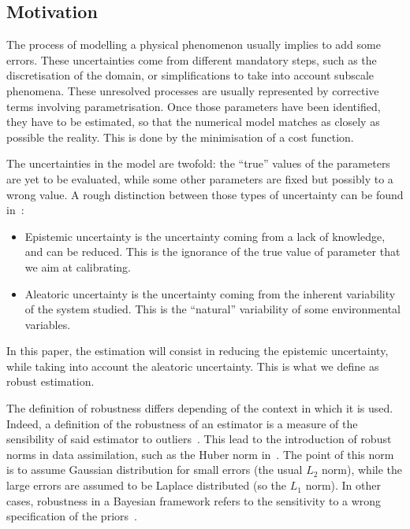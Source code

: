 \documentclass[npg, manuscript]{copernicus}
\begin{document}
\introduction%
\subsection{Motivation}

The process of modelling a physical phenomenon usually implies to add some errors. These uncertainties come from different mandatory steps, such as the discretisation of the domain, or simplifications to take into account subscale phenomena. These unresolved processes are usually represented by corrective terms involving parametrisation. Once those parameters have been identified, they have to be estimated, so that the numerical model matches as closely as possible the reality. This is done by the minimisation of a cost function.

The uncertainties in the model are twofold: the ``true'' values of the parameters are yet to be evaluated, while some other parameters are fixed but possibly to a wrong value.
A rough distinction between those types of uncertainty can be found in~\cite{walker_defining_2003}:
\begin{itemize}
\item Epistemic uncertainty is the uncertainty coming from a lack of knowledge, and can be reduced. This is the ignorance of the true value of parameter that we aim at calibrating.
\item Aleatoric uncertainty is the uncertainty coming from the inherent variability of the system studied. This is the ``natural'' variability of some environmental variables. 
\end{itemize}

In this paper, the estimation will consist in reducing the epistemic uncertainty, while taking into account the aleatoric uncertainty. This is what we define as robust estimation.


The definition of robustness differs depending of the context in which it is used. Indeed, a definition of the robustness of an estimator is a measure of the sensibility of said estimator to outliers~\citep{huber_robust_2011}. This lead to the introduction of robust norms in data assimilation, such as the Huber norm in~\cite{rao_robust_2015}. The point of this norm is to assume Gaussian distribution for small errors (the usual $L_2$ norm), while the large errors are assumed to be Laplace distributed (so the $L_1$ norm).
In other cases, robustness in a Bayesian framework refers to the sensitivity to a wrong specification of the priors~\citep{berger_overview_1994}.
\end{document}
